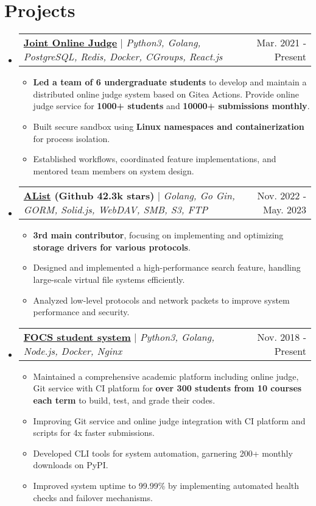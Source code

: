 \documentclass[letterpaper,11pt]{article}
\makeatletter
\newcommand{\resumeItem}[1]{
  \item\small{
    {#1 \vspace{-2pt}}
  }
}
\newcommand{\resumeProjectHeader}[2]{
    \item
    \begin{tabular*}{0.98\textwidth}{l@{\extracolsep{\fill}}r}
      \small#1 & #2 \\
    \end{tabular*}\vspace{-7pt}
}
\newcommand{\resumeSubHeaderListStart}{\begin{itemize}[leftmargin=0.15in, label={}]}
\newcommand{\resumeSubHeaderListEnd}{\end{itemize}}
\newcommand{\resumeItemListStart}{\begin{itemize}}
\newcommand{\resumeItemListEnd}{\end{itemize}\vspace{-5pt}}
\makeatother
\begin{document}
\section{Projects}
    \resumeSubHeaderListStart
      \resumeProjectHeader
        {\href{https://github.com/joint-online-judge}{\textbf{Joint Online Judge}} $|$ \emph{Python3, Golang, PostgreSQL, Redis, Docker, CGroups, React.js}}{Mar. 2021 - Present}
        \resumeItemListStart
          \resumeItem{\textbf{Led a team of 6 undergraduate students} to develop and maintain a distributed online judge system based on Gitea Actions. Provide online judge service for \textbf{1000+ students} and \textbf{10000+ submissions monthly}.}
          \resumeItem{Built secure sandbox using \textbf{Linux namespaces and containerization} for process isolation.}
          \resumeItem{Established workflows, coordinated feature implementations, and mentored team members on system design.}
        \resumeItemListEnd
      \resumeProjectHeader
        {\textbf{\href{https://github.com/alist-org/alist}{AList} (Github 42.3k stars)} $|$ \emph{Golang, Go Gin, GORM, Solid.js, WebDAV, SMB, S3, FTP}}{Nov. 2022 - May. 2023}
        \resumeItemListStart
          \resumeItem{\textbf{3rd main contributor}, focusing on implementing and optimizing \textbf{storage drivers for various protocols}.}
          \resumeItem{Designed and implemented a high-performance search feature, handling large-scale virtual file systems efficiently.}
          \resumeItem{Analyzed low-level protocols and network packets to improve system performance and security.}
        \resumeItemListEnd
      \resumeProjectHeader
        {\href{https://gist.github.com/BoYanZh/fc4469c20fd6adf42c212114532aaac0}{\textbf{FOCS student system}} $|$ \emph{Python3, Golang, Node.js, Docker, Nginx}}{Nov. 2018 - Present}
        \resumeItemListStart
          \resumeItem{Maintained a comprehensive academic platform including online judge, Git service with CI platform for \textbf{over 300 students from 10 courses each term} to build, test, and grade their codes.}
          \resumeItem{Improving Git service and online judge integration with CI platform and scripts for 4x faster submissions.}
          \resumeItem{Developed CLI tools for system automation, garnering 200+ monthly downloads on PyPI.}
          \resumeItem{Improved system uptime to 99.99\% by implementing automated health checks and failover mechanisms.}
        \resumeItemListEnd
    \resumeSubHeaderListEnd
\end{document}
